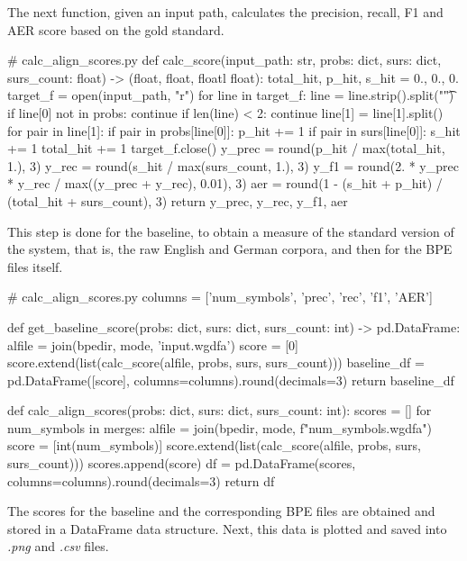 The next function, given an input path, calculates the precision, recall, F1 and AER score based on the gold standard.

\begin{python}
# calc_align_scores.py
def calc_score(input_path: str, probs: dict, surs: dict, surs_count: float) -> (float, float, floatl float):
  total_hit, p_hit, s_hit = 0., 0., 0.
  target_f = open(input_path, "r")
  for line in target_f:
    line = line.strip().split("\t")
    if line[0] not in probs: continue
    if len(line) < 2: continue
    line[1] = line[1].split()
    for pair in line[1]:
      if pair in probs[line[0]]:
        p_hit += 1
      if pair in surs[line[0]]:
        s_hit += 1
      total_hit += 1
  target_f.close()
  y_prec = round(p_hit / max(total_hit, 1.), 3)
  y_rec = round(s_hit / max(surs_count, 1.), 3)
  y_f1 = round(2. * y_prec * y_rec / max((y_prec + y_rec), 0.01), 3)
  aer = round(1 - (s_hit + p_hit) / (total_hit + surs_count), 3)
  return y_prec, y_rec, y_f1, aer
\end{python}

This step is done for the baseline, to obtain a measure of the standard version of the system, that is, the raw English and German corpora, and then for the BPE files itself.

\begin{python}
# calc_align_scores.py
columns = ['num_symbols', 'prec', 'rec', 'f1', 'AER']

def get_baseline_score(probs: dict, surs: dict, surs_count: int) -> pd.DataFrame:
  alfile = join(bpedir, mode, 'input.wgdfa')
  score = [0]
  score.extend(list(calc_score(alfile, probs, surs, surs_count)))
  baseline_df = pd.DataFrame([score], columns=columns).round(decimals=3)
  return baseline_df

def calc_align_scores(probs: dict, surs: dict, surs_count: int):
  scores = []
  for num_symbols in merges:
    alfile = join(bpedir, mode, f"{num_symbols}.wgdfa")
    score = [int(num_symbols)]
    score.extend(list(calc_score(alfile, probs, surs, surs_count)))
    scores.append(score)
  df = pd.DataFrame(scores, columns=columns).round(decimals=3)
  return df
\end{python}

The scores for the baseline and the corresponding BPE files are obtained and stored in a DataFrame data structure. Next, this data is plotted and saved into \emph{.png} and \emph{.csv} files.

